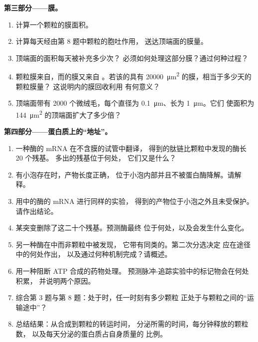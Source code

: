 \begin{problem}
\medskip
\noindent\textbf{第三部分——膜。}
\begin{enumerate}[resume]
  \item 计算一个颗粒的膜面积。
  \item 计算每天经由第 8 题中颗粒的胞吐作用，
        送达顶端面的膜量。
  \item 顶端面的面积每天被补充多少次？
        必须如何处理这部分膜？通过何种过程？
  \item 颗粒膜来自，而的膜又来自
        。若该的具有 \qty{20000}{\micro m^2}
        的膜，相当于多少天的颗粒膜量？
        这说明内的膜回收利用
        有何意义？
  \item 顶端面带有 \qty{2000}{} 个微绒毛，每个直径为
        \qty{0.1}{\micro m}、长为 \qty{1}{\micro m}。它们
        使面积为 \qty{144}{\micro m^2} 的顶端面扩大了多少倍？
\end{enumerate}

\medskip
\noindent\textbf{第四部分——蛋白质上的“地址”。}
\begin{enumerate}[resume]
  \item 一种酶的 mRNA 在不含膜的试管中翻译，
        得到的肽链比颗粒中发现的酶长 \qty{20}{} 个残基。
        多出的残基位于何处，
        它们又是什么？
  \item 有小泡存在时，产物长度正确，
        位于小泡内部并且不被蛋白酶降解。请解释。
  \item 用中的酶的 mRNA 进行同样的实验，
        得到的产物位于小泡之外且未受保护。请作出结论。
  \item 某突变删除了这二十个残基。预测酶最终
        位于何处，以及会发生什么变化。
  \item 另一种酶在中而非颗粒中被发现，
        它带有同类的。第二次分选决定
        应在途径中的何处作出，
        以及通过何种机制完成？请概述。
  \item 用一种阻断 ATP 合成的药物处理。
        预测脉冲-追踪实验中的标记物会在何处积累，
        并说明两个原因。
  \item 综合第 3 题与第 8 题：处于时，任一时刻有多少颗粒
        正处于与颗粒之间的“运输途中”？
  \item 总结结果：从合成到颗粒的转运时间，
        分泌所需的时间，每分钟释放的颗粒数，
        以及每天分泌的蛋白质占自身质量的
        比例。
\end{enumerate}
\end{problem}
